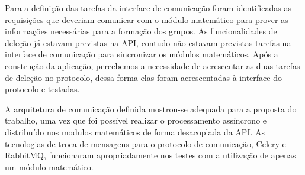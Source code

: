     Para a definição das tarefas da interface de comunicação foram identificadas as requisições que deveriam
    comunicar com o módulo matemático para prover as informações necessárias para a formação dos grupos. 
    As funcionalidades de deleção já estavam previstas na API, contudo não estavam previstas tarefas na interface
    de comunicação para sincronizar os módulos matemáticos. Após a construção da aplicação, 
    percebemos a necessidade de acrescentar as duas tarefas de deleção no protocolo, dessa forma elas foram
    acrescentadas à interface do protocolo e testadas.
    
    A arquitetura de comunicação definida mostrou-se adequada para a proposta do trabalho, uma vez que foi possível
    realizar o processamento assíncrono e distribuído nos modulos matemáticos de forma desacoplada da API.
    As tecnologias de troca de mensagens para o protocolo de comunicação, Celery e RabbitMQ, funcionaram 
    apropriadamente nos testes com a utilização de apenas um módulo matemático. 

    
    
    
      
      